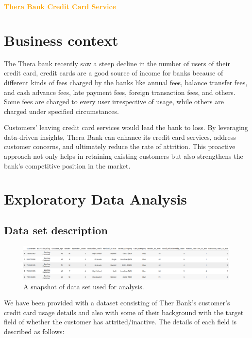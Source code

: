 \documentclass[10pt,a4paper]{style}
\begin{document}
	\tableofcontents
	\listoffigures
	\newpage
	\begin{center}
		\textcolor{orange}{\Large {\bf{Thera Bank Credit Card Service}}}
	\end{center}
	
	\section{Business context}
	The Thera bank recently saw a steep decline in the number of users of their credit card, credit cards are a good source of income for banks because of different kinds of fees charged by the banks like annual fees, balance transfer fees, and cash advance fees, late payment fees, foreign transaction fees, and others. Some fees are charged to every user irrespective of usage, while others are charged under specified circumstances.
	
	Customers’ leaving credit card services would lead the bank to loss. By leveraging data-driven insights, Thera Bank can enhance its credit card services, address customer concerns, and ultimately reduce the rate of attrition. This proactive approach not only helps in retaining existing customers but also strengthens the bank's competitive position in the market.
	
\section{Exploratory Data Analysis}
\subsection{Data set description}
	\begin{figure}[h]
		\centering
		\includegraphics[width=\textwidth]{dataset.png}
		\caption{A snapshot of data set used for analysis.}
		\label{fig:dataset}
	\end{figure}
We have been provided with a dataset consisting of Ther Bank's customer's credit card usage details and also with some of their background with the target field of whether the customer has attrited/inactive. The details of each field is described as follows:
\end{document}
